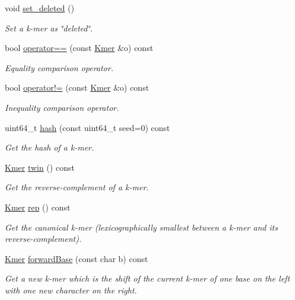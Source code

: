 \begin{DoxyCompactItemize}
\mbox{\label{classKmer_aed7e4989323e49f78e3b0ceeaedc21b4}} 
void \hyperlink{classKmer_aed7e4989323e49f78e3b0ceeaedc21b4}{set\+\_\+deleted} ()
\begin{DoxyCompactList}\small\item\em Set a k-\/mer as \char`\"{}deleted\char`\"{}. \end{DoxyCompactList}\item 
bool \hyperlink{classKmer_a7d0f2060f9bda7c9b29a40e1b991ce85}{operator==} (const \hyperlink{classKmer}{Kmer} \&o) const
\begin{DoxyCompactList}\small\item\em Equality comparison operator. \end{DoxyCompactList}\item 
bool \hyperlink{classKmer_ab859842b0a779eae64aace119eec9244}{operator!=} (const \hyperlink{classKmer}{Kmer} \&o) const
\begin{DoxyCompactList}\small\item\em Inequality comparison operator. \end{DoxyCompactList}\item 
uint64\+\_\+t \hyperlink{classKmer_a11645c016419fec967ab50743cf4c83e}{hash} (const uint64\+\_\+t seed=0) const
\begin{DoxyCompactList}\small\item\em Get the hash of a k-\/mer. \end{DoxyCompactList}\item 
\hyperlink{classKmer}{Kmer} \hyperlink{classKmer_a82924425f6f6bd3e1d746f600936781c}{twin} () const
\begin{DoxyCompactList}\small\item\em Get the reverse-\/complement of a k-\/mer. \end{DoxyCompactList}\item 
\hyperlink{classKmer}{Kmer} \hyperlink{classKmer_a2b86fe792388a910a073d9fc4a811779}{rep} () const
\begin{DoxyCompactList}\small\item\em Get the canonical k-\/mer (lexicographically smallest between a k-\/mer and its reverse-\/complement). \end{DoxyCompactList}\item 
\hyperlink{classKmer}{Kmer} \hyperlink{classKmer_ad21155c7aa0e25973bc8c95047cee78d}{forward\+Base} (const char b) const
\begin{DoxyCompactList}\small\item\em Get a new k-\/mer which is the shift of the current k-\/mer of one base on the left with one new character on the right. \end{DoxyCompactList}\item 

\end{DoxyCompactItemize}
